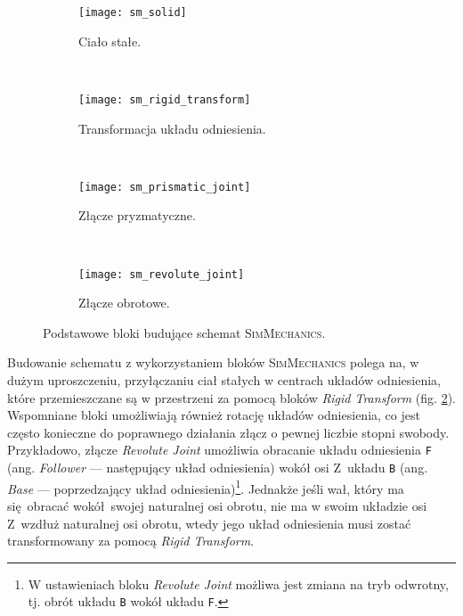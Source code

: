\begin{figure}[h]
    \centering
    \begin{subfigure}[t]{0.2\textwidth}
        \centering
        \texttt{[image: sm\_solid]}
        \caption{Ciało stałe.}
        \label{fig:sm_solid}
    \end{subfigure}
    ~ 
    \begin{subfigure}[t]{0.2\textwidth}
        \centering
        \texttt{[image: sm\_rigid\_transform]}
        \caption{Transformacja układu odniesienia.}
        \label{fig:sm_rigid_transform}
    \end{subfigure}
    ~ 
    \begin{subfigure}[t]{0.2\textwidth}
        \centering
        \texttt{[image: sm\_prismatic\_joint]}
        \caption{Złącze pryzmatyczne.}
        \label{fig:sm_prismatic_joint}
    \end{subfigure}
    ~
    \begin{subfigure}[t]{0.2\textwidth}
        \centering
        \texttt{[image: sm\_revolute\_joint]}
        \caption{Złącze obrotowe.}
        \label{fig:sm_revolute_joint}
    \end{subfigure}
    
    \caption{Podstawowe bloki budujące schemat \textsc{SimMechanics}.}
    \label{fig:simmechanics_bloki}
\end{figure}

Budowanie schematu z wykorzystaniem bloków \textsc{SimMechanics} polega na, w dużym uproszczeniu, przyłączaniu ciał stałych w centrach układów odniesienia, które przemieszczane są w przestrzeni za pomocą bloków \textit{Rigid Transform} (fig. \ref{fig:sm_rigid_transform}). Wspomniane bloki umożliwiają również rotację układów odniesienia, co jest często konieczne do poprawnego działania złącz o pewnej liczbie stopni swobody. Przykładowo, złącze \textit{Revolute Joint} umożliwia obracanie układu odniesienia \texttt{F} (ang. \textit{Follower} --- następujący układ odniesienia) wokół osi Z~układu \texttt{B} (ang. \textit{Base} --- poprzedzający układ odniesienia)\footnote{W ustawieniach bloku \textit{Revolute Joint} możliwa jest zmiana na tryb odwrotny, tj. obrót układu \texttt{B} wokół układu \texttt{F}.}. Jednakże jeśli wał, który ma się obracać wokół swojej naturalnej osi obrotu, nie ma w swoim układzie osi Z~wzdłuż naturalnej osi obrotu, wtedy jego układ odniesienia musi zostać transformowany za pomocą \textit{Rigid Transform}.

